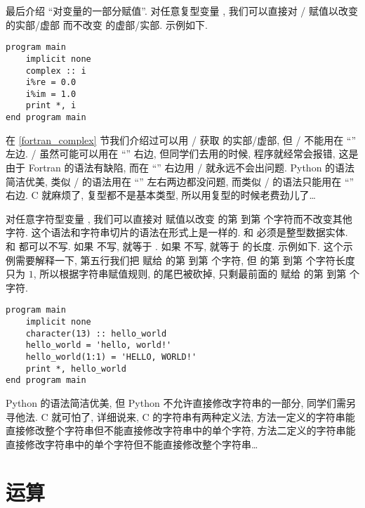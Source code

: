 最后介绍 ``对变量的一部分赋值''. 对任意复型变量 \ttt{[z]}, 我们可以直接对 / 赋值以改变 \ttt{[z]} 的实部/虚部 而不改变 \ttt{[z]} 的虚部/实部. 示例如下.
\begin{lstlisting}
program main
    implicit none
    complex :: i
    i%re = 0.0
    i%im = 1.0
    print *, i
end program main
\end{lstlisting}
在 \ref{fortran_complex} 节我们介绍过可以用 / 获取 \ttt{[z]} 的实部/虚部, 但 / 不能用在 ``\ttt{=}'' 左边. / 虽然可能可以用在 ``\ttt{=}'' 右边, 但同学们去用的时候, 程序就经常会报错, 这是由于 Fortran 的语法有缺陷, 而在 ``\ttt{=}'' 右边用 / 就永远不会出问题. Python 的语法简洁优美, 类似 / 的语法用在 ``\ttt{=}'' 左右两边都没问题, 而类似 / 的语法只能用在 ``\ttt{=}'' 右边. C 就麻烦了, 复型都不是基本类型, 所以用复型的时候老费劲儿了\dots{}

对任意字符型变量 \ttt{[c]}, 我们可以直接对  赋值以改变 \ttt{[c]} 的第  到第  个字符而不改变其他字符. 这个语法和字符串切片的语法在形式上是一样的.  和  必须是整型数据实体.  和  都可以不写. 如果  不写,  就等于 . 如果  不写,  就等于 \ttt{[c]} 的长度. 示例如下. 这个示例需要解释一下, 第五行我们把  赋给  的第  到第  个字符, 但  的第  到第  个字符长度只为 $1$, 所以根据字符串赋值规则,  的尾巴被砍掉, 只剩最前面的  赋给 的第  到第  个字符.
\begin{lstlisting}
program main
    implicit none
    character(13) :: hello_world
    hello_world = 'hello, world!'
    hello_world(1:1) = 'HELLO, WORLD!'
    print *, hello_world
end program main
\end{lstlisting}
Python 的语法简洁优美, 但 Python 不允许直接修改字符串的一部分, 同学们需另寻他法. C 就可怕了, 详细说来, C 的字符串有两种定义法, 方法一定义的字符串能直接修改整个字符串但不能直接修改字符串中的单个字符, 方法二定义的字符串能直接修改字符串中的单个字符但不能直接修改整个字符串\dots{}

\section{运算}\label{fortran_opration}

